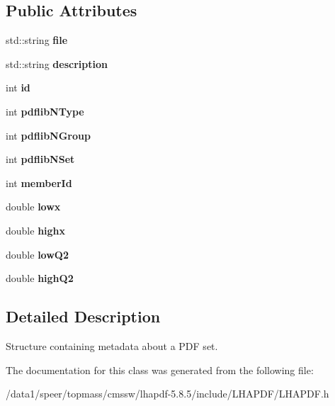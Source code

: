 \subsection*{Public Attributes}
\begin{CompactItemize}
\item 
std::string \textbf{file}\label{classLHAPDF_1_1PDFSetInfo_e8bd38c63eede499c9e3de4ab6cc9e06}

\item 
std::string \textbf{description}\label{classLHAPDF_1_1PDFSetInfo_8d5539fff4e0691f2f69dacbad3c52a7}

\item 
int \textbf{id}\label{classLHAPDF_1_1PDFSetInfo_13739086a5abf595bbe2f4b40d927cac}

\item 
int \textbf{pdflib\-NType}\label{classLHAPDF_1_1PDFSetInfo_85b015780e4bebcbb90feb744b8e020d}

\item 
int \textbf{pdflib\-NGroup}\label{classLHAPDF_1_1PDFSetInfo_5354a7ff98c4715ae97ff21c5c3474a6}

\item 
int \textbf{pdflib\-NSet}\label{classLHAPDF_1_1PDFSetInfo_6bf0fe7a35f36e227ae46727e0edeb22}

\item 
int \textbf{member\-Id}\label{classLHAPDF_1_1PDFSetInfo_3485a094ac44b1044064d1ad1f558925}

\item 
double \textbf{lowx}\label{classLHAPDF_1_1PDFSetInfo_8e5817e1436f97d1040fe7306b1fe0e8}

\item 
double \textbf{highx}\label{classLHAPDF_1_1PDFSetInfo_04be37f2942a5d5535058c7e839a239a}

\item 
double \textbf{low\-Q2}\label{classLHAPDF_1_1PDFSetInfo_c0dd5810c5d76de6a836a090a8fc3559}

\item 
double \textbf{high\-Q2}\label{classLHAPDF_1_1PDFSetInfo_cb4de444aea3827f28ba81390f7ccdc1}

\end{CompactItemize}


\subsection{Detailed Description}
Structure containing metadata about a PDF set. 



The documentation for this class was generated from the following file:\begin{CompactItemize}
\item 
/data1/speer/topmass/cmssw/lhapdf-5.8.5/include/LHAPDF/LHAPDF.h\end{CompactItemize}
